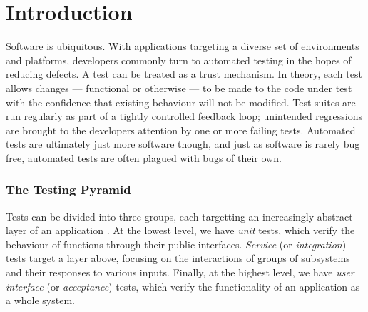 \section{Introduction}
\label{sec:intro}


Software is ubiquitous. With applications targeting a diverse set of environments and platforms, developers commonly turn to automated testing in the hopes of reducing defects. A test can be treated as a trust mechanism. In theory, each test allows changes --- functional or otherwise --- to be made to the code under test with the confidence that existing behaviour will not be modified. Test suites are run regularly as part of a tightly controlled feedback loop; unintended regressions are brought to the developers attention by one or more failing tests. Automated tests are ultimately just more software though, and just as software is rarely bug free, automated tests are often plagued with bugs of their own.

\subsubsection{The Testing Pyramid}
\label{sec:sec:sec:the_testing_pyramid}

Tests can be divided into three groups, each targetting an increasingly abstract layer of an application \citep[see][Chapter~16]{cohn2009succeeding}. At the lowest level, we have \emph{unit} tests, which verify the behaviour of functions through their public interfaces. \emph{Service} (or \emph{integration}) tests target a layer above, focusing on the interactions of groups of subsystems and their responses to various inputs. Finally, at the highest level, we have \emph{user interface} (or \emph{acceptance}) tests, which verify the functionality of an application as a whole system.

